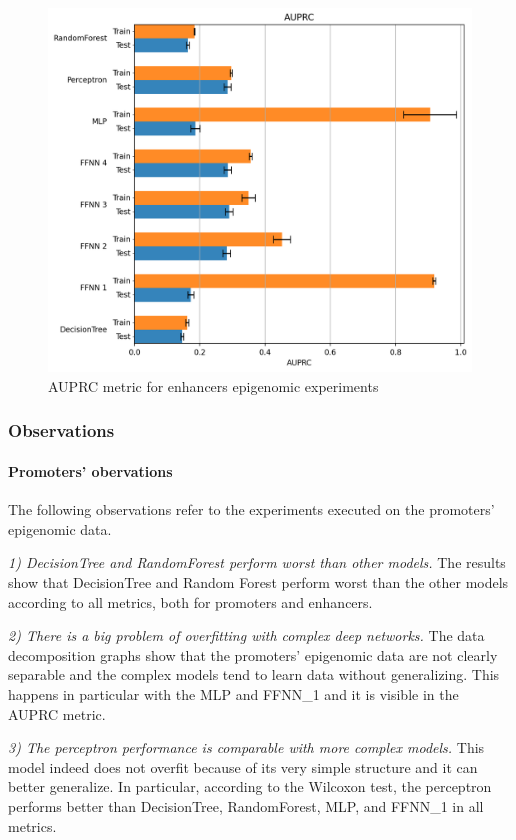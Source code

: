 \begin{figure}[h!]
	\centering
	\includegraphics[width=0.77\linewidth]{../images/epigemomic_results/enhancers/auprc.png}
	\caption{AUPRC metric for enhancers epigenomic experiments}
\end{figure}
\subsubsection{Observations}
\paragraph{Promoters' obervations}
The following observations refer to the experiments executed on the promoters' epigenomic data.
\newline
\par
\emph{1) DecisionTree and RandomForest perform worst than other models.}
The results show that DecisionTree and Random Forest perform worst than
the other models according to all metrics, both for promoters and
enhancers.

\emph{2) There is a big problem of overfitting with complex deep
networks.} The data decomposition graphs show that the promoters'
epigenomic data are not clearly separable and the complex models tend to
learn data without generalizing. This happens in particular with the MLP
and FFNN\_1 and it is visible in the AUPRC metric.

\emph{3) The perceptron performance is comparable with more complex
models.} This model indeed does not overfit because of its very simple
structure and it can better generalize. In particular, according to the
Wilcoxon test, the perceptron performs better than DecisionTree,
RandomForest, MLP, and FFNN\_1 in all metrics.

